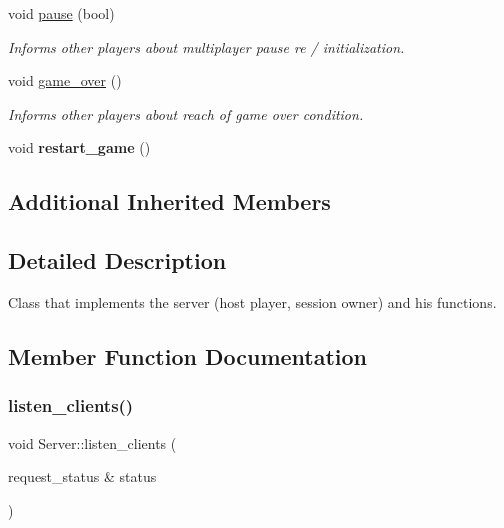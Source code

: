 \begin{DoxyCompactItemize}
\mbox{\label{classServer_a680289a9bc8cd933e208b6ff2b78feb7}} 
void \hyperlink{classServer_a680289a9bc8cd933e208b6ff2b78feb7}{pause} (bool)
\begin{DoxyCompactList}\small\item\em Informs other players about multiplayer pause re / initialization. \end{DoxyCompactList}\item 
\mbox{\label{classServer_abe43e70e1c8bdf76c5e4f062a9827eff}} 
void \hyperlink{classServer_abe43e70e1c8bdf76c5e4f062a9827eff}{game\+\_\+over} ()
\begin{DoxyCompactList}\small\item\em Informs other players about reach of game over condition. \end{DoxyCompactList}\item 
\mbox{\label{classServer_a743f9090b1a517b6dd9656721685e4e8}} 
void {\bfseries restart\+\_\+game} ()
\end{DoxyCompactItemize}
\subsection*{Additional Inherited Members}


\subsection{Detailed Description}
Class that implements the server (host player, session owner) and his functions. 

\subsection{Member Function Documentation}
\mbox{\label{classServer_a4d1e997c505b0e0eae2d579eae4b5d1c}} 
\subsubsection{\texorpdfstring{listen\+\_\+clients()}{listen\_clients()}}
{\footnotesize\ttfamily void Server\+::listen\+\_\+clients (\begin{DoxyParamCaption}\item[{request\+\_\+status \&}]{status }\end{DoxyParamCaption})}



